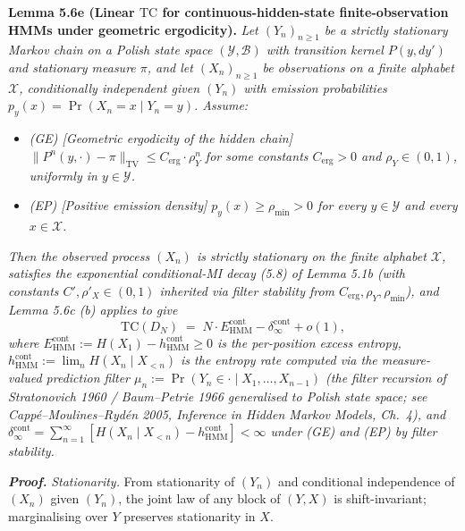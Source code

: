 \documentclass[
]{article}
\begin{document}
\textbf{Lemma 5.6e (Linear $\mathrm{TC}$ for continuous-hidden-state
finite-observation HMMs under geometric ergodicity).}
\emph{Let $(Y_n)_{n \geq 1}$ be a strictly stationary Markov chain on
a Polish state space $(\mathcal{Y}, \mathcal{B})$ with transition
kernel $P(y, dy')$ and stationary measure $\pi$, and let
$(X_n)_{n \geq 1}$ be observations on a \emph{finite} alphabet
$\mathcal{X}$, conditionally independent given $(Y_n)$ with
emission probabilities $p_y(x) = \Pr(X_n = x \mid Y_n = y)$.
Assume:}
\begin{itemize}
\item \emph{(GE) [Geometric ergodicity of the hidden chain]
$\|P^n(y, \cdot) - \pi\|_{\mathrm{TV}} \leq C_{\mathrm{erg}} \cdot
\rho_Y^n$ for some constants $C_{\mathrm{erg}} > 0$ and $\rho_Y \in
(0, 1)$, uniformly in $y \in \mathcal{Y}$.}
\item \emph{(EP) [Positive emission density] $p_y(x) \geq \rho_{\min} > 0$
for every $y \in \mathcal{Y}$ and every $x \in \mathcal{X}$.}
\end{itemize}
\emph{Then the observed process $(X_n)$ is strictly stationary on the
finite alphabet $\mathcal{X}$, satisfies the exponential
conditional-MI decay (5.8) of Lemma 5.1b (with constants
$C', \rho'_X \in (0, 1)$ inherited via filter stability from
$C_{\mathrm{erg}}, \rho_Y, \rho_{\min}$), and Lemma 5.6c (b) applies
to give}
\[
\mathrm{TC}(D_N) \;=\; N \cdot E_{\mathrm{HMM}}^{\mathrm{cont}}
                       - \delta_\infty^{\mathrm{cont}} + o(1),
\]
\emph{where $E_{\mathrm{HMM}}^{\mathrm{cont}} := H(X_1) -
h_{\mathrm{HMM}}^{\mathrm{cont}} \geq 0$ is the per-position excess
entropy, $h_{\mathrm{HMM}}^{\mathrm{cont}} := \lim_n H(X_n \mid X_{<n})$
is the entropy rate computed via the measure-valued prediction
filter $\mu_n := \Pr(Y_n \in \cdot \mid X_1, \ldots, X_{n-1})$ (the
filter recursion of Stratonovich 1960 / Baum--Petrie 1966 generalised
to Polish state space; see Capp{\'e}--Moulines--Ryd{\'e}n 2005,
\emph{Inference in Hidden Markov Models}, Ch.\ 4), and
$\delta_\infty^{\mathrm{cont}} = \sum_{n=1}^\infty
[H(X_n \mid X_{<n}) - h_{\mathrm{HMM}}^{\mathrm{cont}}] < \infty$
under (GE) and (EP) by filter stability.}

\emph{\textbf{Proof.}} \emph{Stationarity.} From stationarity of
$(Y_n)$ and conditional independence of $(X_n)$ given $(Y_n)$, the
joint law of any block of $(Y, X)$ is shift-invariant; marginalising
over $Y$ preserves stationarity in $X$.
\end{document}

